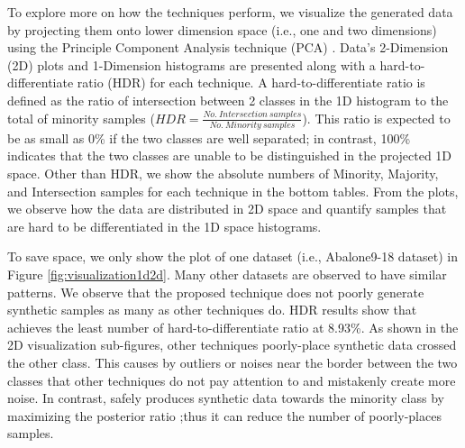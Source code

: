 To explore more on how the techniques perform, we visualize the generated data by projecting them onto lower dimension space (i.e., one and two dimensions) using the Principle Component Analysis technique (PCA) \cite{PCA}. Data's 2-Dimension (2D) plots and 1-Dimension histograms are presented along with a hard-to-differentiate ratio (HDR) for each technique. A hard-to-differentiate ratio is defined as the ratio of intersection between 2 classes in the 1D histogram to the total of minority samples ($HDR = \frac{No.\: Intersection \: samples}{No. \: Minority \: samples} $). This ratio is expected to be as small as 0\% if the two classes are well separated; in contrast, 100\% indicates that the two classes are unable to be distinguished in the projected 1D space. Other than HDR, we show the absolute numbers of Minority, Majority, and Intersection samples for each technique in the bottom tables. From the plots, we observe how the data are distributed in 2D space and quantify samples that are hard to be differentiated in the 1D space histograms.    

To save space, we only show the plot of one dataset (i.e., Abalone9-18 dataset) in Figure \ref{fig:visualization1d2d}. Many other datasets are observed to have similar patterns. We observe that the proposed technique does not poorly generate synthetic samples as many as other techniques do. HDR results show that \Methodname{} achieves the least number of hard-to-differentiate ratio at 8.93\%. As shown in the 2D visualization sub-figures, other techniques poorly-place synthetic data crossed the other class. This causes by outliers or noises near the border between the two classes that other techniques do not pay attention to and mistakenly create more noise. In contrast, \Methodname{} safely produces synthetic data towards the minority class by maximizing the posterior ratio ;thus it can reduce the number of poorly-places samples.

